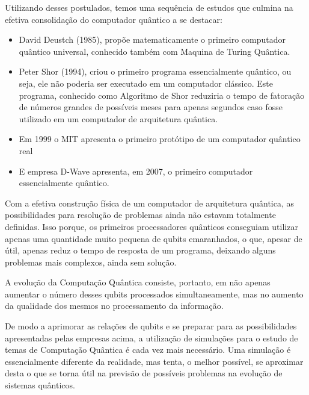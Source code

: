 \documentclass[12pt,oneside,brazil,hidelinks,article,sumario=tradicional,a4paper]{abntex2}
\begin{document}
Utilizando desses postulados, temos uma sequência de estudos que culmina na efetiva consolidação do computador quântico a se destacar:
\begin{itemize}
    \item  David Deustch (1985), propõe matematicamente o primeiro computador quântico universal, conhecido também com Maquina de Turing Quântica.%
    
    \item  Peter Shor (1994), criou o primeiro programa essencialmente quântico, ou seja, ele não poderia ser executado em um computador clássico. Este programa, conhecido como Algoritmo de Shor reduziria o tempo de fatoração de números grandes de possíveis meses para apenas segundos caso fosse utilizado em um computador de arquitetura quântica.
    
    \item  Em 1999 o MIT apresenta o primeiro protótipo de um computador quântico real %
    
    \item  E empresa D-Wave apresenta, em 2007, o primeiro computador essencialmente quântico.
\end{itemize}
 
Com a efetiva construção física de um computador de arquitetura quântica, as possibilidades para resolução de problemas ainda não estavam totalmente definidas. Isso porque, os primeiros processadores quânticos conseguiam utilizar apenas uma quantidade muito pequena de qubits emaranhados, o que, apesar de útil, apenas reduz o tempo de resposta de um programa, deixando alguns problemas mais complexos, ainda sem solução.

A evolução da Computação Quântica consiste, portanto, em não apenas aumentar o número desses qubits processados simultaneamente, mas no aumento da qualidade dos mesmos no processamento da informação.

De modo a aprimorar as relações de qubits e se preparar para as possibilidades apresentadas pelas empresas acima, a utilização de simulações para o estudo de temas de Computação Quântica é cada vez mais necessário. Uma simulação é essencialmente diferente da realidade, mas tenta, o melhor possível, se aproximar desta o que se torna útil na previsão de possíveis problemas na evolução de sistemas quânticos.
\end{document}
